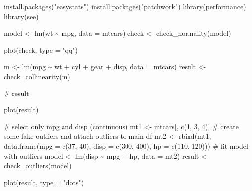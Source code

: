 \documentclass[
  10pt]{article}
\newenvironment{Shaded}{\begin{snugshade}}{\end{snugshade}}
\newcommand{\AttributeTok}[1]{\textcolor[rgb]{0.40,0.45,0.13}{#1}}
\newcommand{\CommentTok}[1]{\textcolor[rgb]{0.37,0.37,0.37}{#1}}
\newcommand{\DecValTok}[1]{\textcolor[rgb]{0.68,0.00,0.00}{#1}}
\newcommand{\FunctionTok}[1]{\textcolor[rgb]{0.28,0.35,0.67}{#1}}
\newcommand{\NormalTok}[1]{\textcolor[rgb]{0.00,0.23,0.31}{#1}}
\newcommand{\OtherTok}[1]{\textcolor[rgb]{0.00,0.23,0.31}{#1}}
\newcommand{\SpecialCharTok}[1]{\textcolor[rgb]{0.37,0.37,0.37}{#1}}
\newcommand{\StringTok}[1]{\textcolor[rgb]{0.13,0.47,0.30}{#1}}
\begin{document}
\begin{Shaded}
\begin{Highlighting}[]
\FunctionTok{install.packages}\NormalTok{(}\StringTok{"easystats"}\NormalTok{)}
\FunctionTok{install.packages}\NormalTok{(}\StringTok{"patchwork"}\NormalTok{)}
\FunctionTok{library}\NormalTok{(performance)}
\FunctionTok{library}\NormalTok{(see)}

\NormalTok{model }\OtherTok{\textless{}{-}} \FunctionTok{lm}\NormalTok{(wt }\SpecialCharTok{\textasciitilde{}}\NormalTok{ mpg, }\AttributeTok{data =}\NormalTok{ mtcars)}
\NormalTok{check }\OtherTok{\textless{}{-}} \FunctionTok{check\_normality}\NormalTok{(model)}

\FunctionTok{plot}\NormalTok{(check, }\AttributeTok{type =} \StringTok{"qq"}\NormalTok{)}

\NormalTok{m }\OtherTok{\textless{}{-}} \FunctionTok{lm}\NormalTok{(mpg }\SpecialCharTok{\textasciitilde{}}\NormalTok{ wt }\SpecialCharTok{+}\NormalTok{ cyl }\SpecialCharTok{+}\NormalTok{ gear }\SpecialCharTok{+}\NormalTok{ disp, }\AttributeTok{data =}\NormalTok{ mtcars)}
\NormalTok{result }\OtherTok{\textless{}{-}} \FunctionTok{check\_collinearity}\NormalTok{(m)}

\CommentTok{\# result}

\FunctionTok{plot}\NormalTok{(result)}


\CommentTok{\# select only mpg and disp (continuous)}
\NormalTok{mt1 }\OtherTok{\textless{}{-}}\NormalTok{ mtcars[, }\FunctionTok{c}\NormalTok{(}\DecValTok{1}\NormalTok{, }\DecValTok{3}\NormalTok{, }\DecValTok{4}\NormalTok{)]}
\CommentTok{\# create some fake outliers and attach outliers to main df}
\NormalTok{mt2 }\OtherTok{\textless{}{-}} \FunctionTok{rbind}\NormalTok{(mt1, }\FunctionTok{data.frame}\NormalTok{(}\AttributeTok{mpg =} \FunctionTok{c}\NormalTok{(}\DecValTok{37}\NormalTok{, }\DecValTok{40}\NormalTok{), }\AttributeTok{disp =} \FunctionTok{c}\NormalTok{(}\DecValTok{300}\NormalTok{, }\DecValTok{400}\NormalTok{), }\AttributeTok{hp =} \FunctionTok{c}\NormalTok{(}\DecValTok{110}\NormalTok{, }\DecValTok{120}\NormalTok{)))}
\CommentTok{\# fit model with outliers}
\NormalTok{model }\OtherTok{\textless{}{-}} \FunctionTok{lm}\NormalTok{(disp }\SpecialCharTok{\textasciitilde{}}\NormalTok{ mpg }\SpecialCharTok{+}\NormalTok{ hp, }\AttributeTok{data =}\NormalTok{ mt2)}
\NormalTok{result }\OtherTok{\textless{}{-}} \FunctionTok{check\_outliers}\NormalTok{(model)}

\FunctionTok{plot}\NormalTok{(result, }\AttributeTok{type =} \StringTok{"dots"}\NormalTok{)}


\end{Highlighting}
\end{Shaded}
\end{document}
